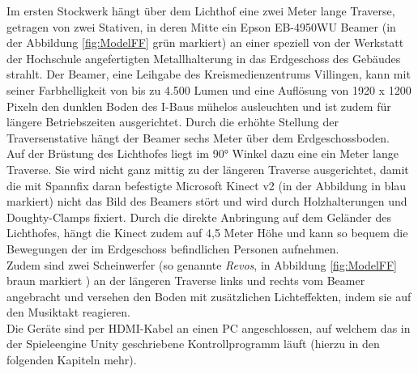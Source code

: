 Im ersten Stockwerk hängt über dem Lichthof eine zwei Meter lange Traverse, getragen von zwei Stativen, in deren Mitte ein Epson EB-4950WU Beamer (in der Abbildung \autoref{fig:ModelFF} grün markiert) an einer speziell von der Werkstatt der Hochschule angefertigten Metallhalterung in das Erdgeschoss des Gebäudes strahlt. Der Beamer, eine Leihgabe des Kreismedienzentrums Villingen, kann mit seiner Farbhelligkeit von bis zu 4.500 Lumen und eine Auflösung von 1920 x 1200 Pixeln den dunklen Boden des I-Baus mühelos ausleuchten und ist zudem für längere Betriebszeiten ausgerichtet. Durch die erhöhte Stellung der Traversenstative hängt der Beamer sechs Meter über dem Erdgeschossboden.\\
Auf der Brüstung des Lichthofes liegt im 90° Winkel dazu eine ein Meter lange Traverse. Sie wird nicht ganz mittig zu der längeren Traverse ausgerichtet, damit die mit Spannfix daran befestigte Microsoft Kinect v2 (in der Abbildung in blau markiert) nicht das Bild des Beamers stört und wird durch Holzhalterungen und Doughty-Clamps fixiert. Durch die direkte Anbringung auf dem Geländer des Lichthofes, hängt die Kinect zudem auf 4,5 Meter Höhe und kann so bequem die Bewegungen der im Erdgeschoss befindlichen Personen aufnehmen.\\
Zudem sind zwei Scheinwerfer (so genannte \textit{Revos}, in Abbildung \autoref{fig:ModelFF} braun markiert ) an der längeren Traverse links und rechts vom Beamer angebracht und versehen den Boden mit zusätzlichen Lichteffekten, indem sie auf den Musiktakt reagieren.\\
Die Geräte sind per HDMI-Kabel an einen PC angeschlossen, auf welchem das in der Spieleengine Unity geschriebene Kontrollprogramm läuft (hierzu in den folgenden Kapiteln mehr).


